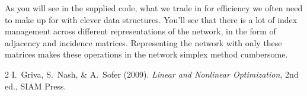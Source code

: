\documentclass[12pt]{amsart}
\begin{document}
        As you will see in the supplied code, what we trade in for efficiency we often need to make up for with clever data structures. You'll see that 
        there is a lot of index management across different representations of the network, in the form of adjacency and incidence matrices. Representing 
        the network with only these matrices makes these operations in the network simplex method cumbersome.  
        

\begin{thebibliography}{2}  %
I.~Griva, S.~Nash, \& A.~Sofer (2009).
\textit{Linear and Nonlinear Optimization},
2nd ed., SIAM Press.
\end{thebibliography}
\end{document}
